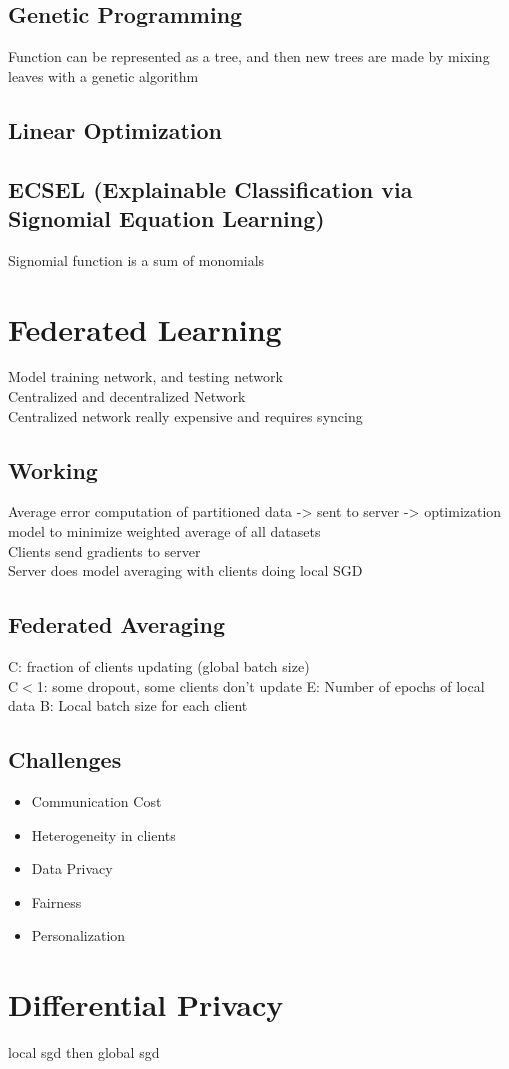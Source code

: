 \documentclass[11pt]{article}
\theoremstyle{definition}
\begin{document}
\subsection{Genetic Programming}
Function can be represented as a tree, and then new trees are made by mixing leaves with a genetic algorithm
\subsection{Linear Optimization}
\subsection{ECSEL (Explainable Classification via Signomial Equation Learning)}
Signomial function is a sum of monomials
\section{Federated Learning}
Model training network, and testing network\\
Centralized and decentralized Network\\
Centralized network really expensive and requires syncing
\subsection{Working}
Average error computation of partitioned data -> sent to server -> optimization model to minimize weighted average of all datasets\\
Clients send gradients to server\\
Server does model averaging with clients doing local SGD
\subsection{Federated Averaging}
C: fraction of clients updating (global batch size)\\
C$<$1: some dropout, some clients don't update
E: Number of epochs of local data
B: Local batch size for each client
\subsection{Challenges}
\begin{itemize}
  \item Communication Cost
  \item Heterogeneity in clients
        \item Data Privacy
        \item Fairness
        \item Personalization
        \end{itemize}
\section{Differential Privacy}
local sgd then global sgd
\end{document}
